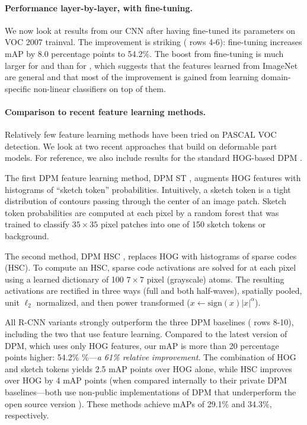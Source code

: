 \paragraph{Performance layer-by-layer, with fine-tuning.}

We now look at results from our CNN after having fine-tuned its parameters on VOC 2007 trainval.
The improvement is striking ( rows 4-6):
fine-tuning increases mAP by 8.0 percentage points to 54.2\%. 
The boost from fine-tuning is much larger for  and  than for ,
which suggests that the  features learned from ImageNet are general and that most of the improvement is gained from learning domain-specific non-linear classifiers on top of them.

\paragraph{Comparison to recent feature learning methods.}
Relatively few feature learning methods have been tried on PASCAL VOC detection.
We look at two recent approaches that build on deformable part models. For reference, we also include results for the standard HOG-based DPM \cite{release5}.

The first DPM feature learning method, DPM ST \cite{lim2013sketch},
augments HOG features with histograms of ``sketch
token'' probabilities. Intuitively, a sketch token is
a tight distribution of contours passing through the center of
an image patch.
Sketch token probabilities are computed at
each pixel by a random forest that was trained to classify
$35 \times 35$ pixel patches into one of 150 sketch tokens or background.

The second method, DPM HSC \cite{HSC}, replaces HOG with histograms of sparse codes (HSC). To compute an HSC, sparse code
activations are solved for at each pixel using a learned dictionary
of 100 $7 \times 7$ pixel (grayscale) atoms. The resulting activations are 
rectified in three ways (full and both half-waves), spatially pooled,
unit $\ell_2$ normalized,
and then power transformed ($x \leftarrow \textrm{sign}(x)|x|^\alpha$).

All R-CNN variants strongly outperform the three DPM baselines ( rows 8-10), including
the two that use feature learning. Compared to the latest version of
DPM, which uses only HOG features, our mAP is more than 20 percentage points higher: 54.2\% \%---\emph{a 61\% relative improvement}.
The combination of HOG and sketch tokens 
yields 2.5 mAP points over HOG alone, while HSC improves over HOG
by 4 mAP points (when compared internally
to their private DPM baselines---both use non-public implementations of DPM
that underperform the open source version \cite{release5}). These methods achieve mAPs of 29.1\% and 34.3\%, respectively.

